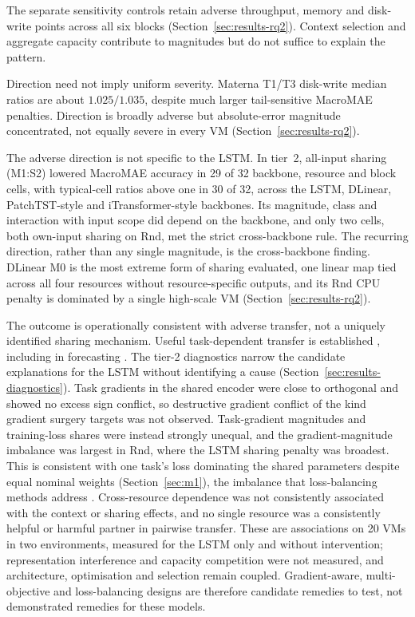 \documentclass[5p,twocolumn]{elsarticle}
\begin{document}
The separate sensitivity controls retain adverse throughput, memory and
disk-write points across all six blocks (Section~\ref{sec:results-rq2}).
Context selection and aggregate capacity contribute to magnitudes but do not
suffice to explain the pattern.

Direction need not imply uniform severity. Materna T1/T3 disk-write median
ratios are about $1.025/1.035$, despite much larger tail-sensitive MacroMAE penalties.
Direction is broadly adverse but absolute-error magnitude concentrated,
not equally severe in every VM (Section~\ref{sec:results-rq2}).

The adverse direction is not specific to the LSTM. In tier~2, all-input
sharing (M1:S2) lowered MacroMAE accuracy in 29 of 32 backbone, resource and
block cells, with typical-cell ratios above one in 30 of 32, across the
LSTM, DLinear, PatchTST-style and iTransformer-style backbones. Its
magnitude, class and interaction with input scope did depend on the
backbone, and only two cells, both own-input sharing on Rnd, met the strict
cross-backbone rule. The recurring direction, rather than any single
magnitude, is the cross-backbone finding. DLinear M0 is the most extreme
form of sharing evaluated, one linear map tied across all four resources
without resource-specific outputs, and its Rnd CPU penalty is dominated by a
single high-scale VM (Section~\ref{sec:results-rq2}).

The outcome is operationally consistent with adverse transfer, not a uniquely
identified sharing mechanism. Useful task-dependent transfer is established
\citep{Caruana1997Multitask,Standley2020TaskGrouping,Fifty2021TaskGroupings},
including in forecasting \citep{Nikentari2022NARMAXLSTM,Nochumsohn2025MTLinear}.
The tier-2 diagnostics narrow the candidate explanations for the LSTM
without identifying a cause (Section~\ref{sec:results-diagnostics}). Task
gradients in the shared encoder were close to orthogonal and showed no
excess sign conflict, so destructive gradient conflict of the kind gradient
surgery targets \citep{Yu2020GradientSurgery} was not observed. Task-gradient
magnitudes and training-loss shares were instead strongly unequal, and the
gradient-magnitude imbalance was largest in Rnd, where the LSTM sharing
penalty was broadest. This is consistent
with one task's loss dominating the shared parameters despite equal nominal
weights (Section~\ref{sec:m1}), the imbalance that loss-balancing methods
address \citep{Chen2018GradNorm}. Cross-resource dependence was not
consistently associated with the context or sharing effects, and no single resource was a consistently
helpful or harmful partner in pairwise transfer. These are associations on
20 VMs in two environments, measured for the LSTM only and without
intervention; representation interference and capacity competition were
not measured, and architecture, optimisation and selection remain coupled.
Gradient-aware, multi-objective and loss-balancing designs
\citep{Sener2018MultiObjective,Yu2020GradientSurgery,Chen2018GradNorm} are
therefore candidate remedies to test, not demonstrated remedies for these
models.
\end{document}
